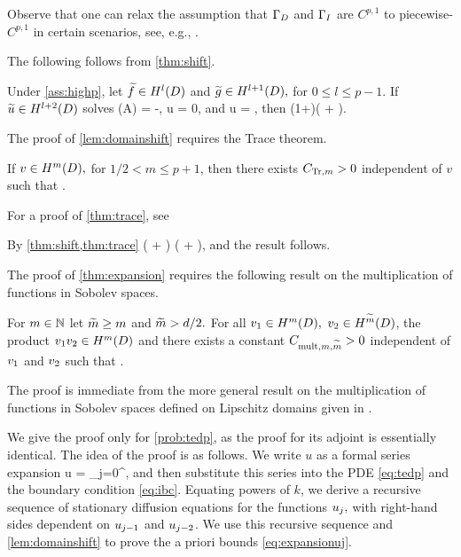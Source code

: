 Observe that one can relax the assumption that $\Gamma_{D}$ and $\Gamma_{I}$ are $C^{p,1}$ to piecewise-$C^{p,1}$ in certain scenarios, see, e.g., \cite[Section 2.1]{ChNi:19}.
\ere




The following  follows from \cref{thm:shift}.

\bco\label{lem:domainshift}
Under \cref{ass:highp}, let $\ftilde \in \HlD$ and $\gtilde \in \HlpoD,$ for $0 \leq l \leq p-1$. If $\utilde \in \HlptD$ solves
\beqs
\grad \cdot \mleft(A\grad \utilde\mright) = -\ftilde,
\eeqs
\beqs \trGD u = 0,
\eeqs
and
\beqs
\dn u = \trGI \gtilde,
\eeqs
then
\beqs
\NHlptD{\utilde} \leq \CAl\mleft(1+\CTrlpo\mright)\mleft(\NHlD{\ftilde} + \NHlpoD{\trGI \gtilde}\mright).
\eeqs
\eco

The proof of \cref{lem:domainshift} requires the Trace theorem.

\label{thm:trace}
If $v \in \HmD,$ for $1/2 < m \leq p+1$, then there exists $C_{\mathrm{Tr},m} > 0$ independent of $v$ such that
\beqs
{} \leq \CTrm {}.
\eeqs
\enth

For a proof of \cref{thm:trace}, see \cite[Theorem 3.37]{Mc:00}

By \cref{thm:shift,thm:trace}
\beqs
\NHlptD{\utilde} \leq \CAl \mleft(\NHlD{\ftilde} + \NHlphGI{\trI\gtilde}\mright) \leq \CAl \mleft(\NHlD{\ftilde} + \NHlpoD{\gtilde}\mright),
\eeqs
and the result follows.
\epf

The proof of \cref{thm:expansion} requires the following result on the multiplication of functions in Sobolev spaces.

\label{thm:banachalg}

For $m \in \mathbb N$ let $\widetilde{m} \geq m$ and $\widetilde{m} > d/2.$ For all $\vo \in \HmD,$ $\vt \in \HmtildeD$, the product $\vo\vt \in \HmD$ and there exists a constant $C_{\mathrm{mult},m,\widetilde{m}} > 0$ independent of $v_{1}$ and $v_{2}$ such that
\beqs
\NHmD{\vo\vt} \leq {} \NHmD{\vo}\NHmtildeD{\vt}.
\eeqs
\enth

The proof is immediate from the more general result on the multiplication of functions in Sobolev spaces defined on Lipschitz domains given in \cite[Theorem 6.1, Corollary 6.3]{BeHo:17}.
\epf


\label{page:thmexpansionproof}
We give the proof only for \cref{prob:tedp}, as the proof for its adjoint is essentially identical. The idea of the proof is as follows. We write $u$ as a formal series expansion
\beq\label{eq:formalseries}
u = \sum_{j=0}^\infty \usj,
\eeq
and then substitute this series into the PDE \cref{eq:tedp} and the boundary condition \eqref{eq:ibc}. Equating powers of $k$, we derive a recursive sequence of stationary diffusion equations for the functions $u_{j},$ with right-hand sides dependent on $u_{j-1}$ and $u_{j-2}$. We use this recursive sequence and \cref{lem:domainshift} to prove the a priori bounds \cref{eq:expansionuj}.

